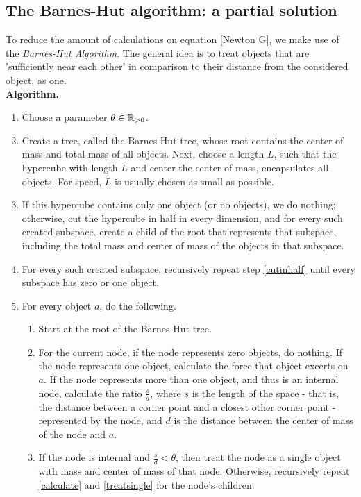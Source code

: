 \subsection{The Barnes-Hut algorithm: a partial solution}
To reduce the amount of calculations on equation \ref{Newton G}, we make use of the \textit{Barnes-Hut Algorithm}.\cite{barneshut} The general idea is to treat objects that are 'sufficiently near each other' in comparison to their distance from the considered object, as one.\\
\textbf{Algorithm.}
\begin{enumerate}
\item Choose a parameter $\theta \in \mathbb{R}_{>0}$.
\item Create a tree, called the Barnes-Hut tree, whose root contains the center of mass and total mass of all objects. Next, choose a length $L$, such that the hypercube with length $L$ and center the center of mass, encapsulates all objects. For speed, $L$ is usually chosen as small as possible.
\item If this hypercube contains only one object (or no objects), we do nothing; otherwise, cut the hypercube in half in every dimension, and for every such created subspace, create a child of the root that represents that subspace, including the total mass and center of mass of the objects in that subspace.\label{cutinhalf}
\item For every such created subspace, recursively repeat step \ref{cutinhalf} until every subspace has zero or one object.
\item For every object $a$, do the following.
\begin{enumerate}
\item Start at the root of the Barnes-Hut tree.
\item For the current node, if the node represents zero objects, do nothing. If the node represents one object, calculate the force that object excerts on $a$. If the node represents more than one object, and thus is an internal node, calculate the ratio $\frac{s}{d}$, where $s$ is the length of the space - that is, the distance between a corner point and a closest other corner point - represented by the node, and $d$ is the distance between the center of mass of the node and $a$.\label{calculate}
\item If the node is internal and $\frac{s}{d}<\theta$, then treat the node as a single object with mass and center of mass of that node. Otherwise, recursively repeat \ref{calculate} and \ref{treatsingle} for the node's children.\label{treatsingle}
\end{enumerate}
\end{enumerate}
